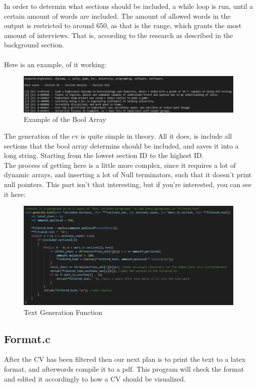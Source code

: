In order to determin what sections should be included, a while loop is run, until a certain amount of words are included.
The amount of allowed words in the output is restricted to around 650, as that is the range, which grants the most amount of interviews.
That is, according to the research as described in the background section.
\\ \\
Here is an example, of it working: 
\begin{figure}[H]
  \centering
  \includegraphics[scale = 0.6]{figures/bool_example.png}
  \caption{Example of the Bool Array}\label{fig:ie}
\end{figure}
The generation of the cv is quite simple in theory. All it does, is include all sections that the bool array determins should be included, and saves it into a long string.
Starting from the lowest section ID to the highest ID. \\
The process of getting here is a little more complex, since it requires a lot of dynamic arrays, and inserting a lot of Null terminators, such  that it doesn't print null pointers.
This part isn't that interesting, but if you're interested, you can see it here:
\begin{figure}[H]
  \centering
  \includegraphics[scale = 0.6]{figures/generate.png}
  \caption{Text Generation Function}\label{fig:ie}
\end{figure}
\subsection{Format.c}
After the CV has been filtered then our next plan is to print the text to a latex format, and afterwords compile it to a pdf. 
This program will check the format and edited it accordingly to how a CV should be visualized.

